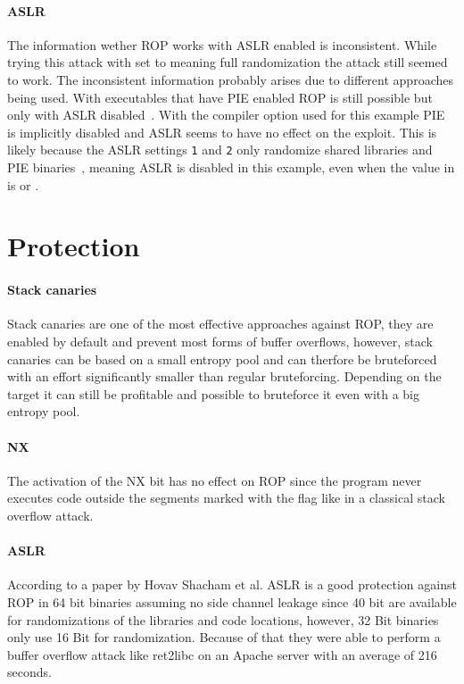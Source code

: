\documentclass[journal=tosc,submission, notanonymous]{iacrtrans}
\begin{document}
\paragraph{ASLR}
The information wether ROP works with ASLR enabled is inconsistent. While trying this attack with  set to  meaning full randomization the attack still seemed to work. The inconsistent information probably arises due to different approaches being used. With executables that have PIE enabled ROP is still possible but only with ASLR disabled~\cite{el-sherei}. With the compiler option  used for this example PIE is implicitly disabled and ASLR seems to have no effect on the exploit. This is likely because the ASLR settings \Verb+1+ and \Verb+2+ only randomize shared libraries and PIE binaries~\cite{rny}, meaning ASLR is disabled in this example, even when the value in  is  or .

\section{Protection}
\paragraph{Stack canaries}
Stack canaries are one of the most effective approaches against ROP, they are enabled by default and prevent most forms of buffer overflows, however, stack canaries can be based on a small entropy pool and can therfore be bruteforced with an effort significantly smaller than regular bruteforcing. Depending on the target it can still be profitable and possible to bruteforce it even with a big entropy pool.
\paragraph{NX}
The activation of the NX bit has no effect on ROP since the program never executes code outside the segments marked with the  flag like in a classical stack overflow attack.~\cite{ropsla}
\paragraph{ASLR}
According to a paper by Hovav Shacham et al. ASLR is a good protection against ROP in 64 bit binaries assuming no side channel leakage since 40 bit are available for randomizations of the libraries and code locations, however, 32 Bit binaries only use 16 Bit for randomization. Because of that they were able to perform a buffer overflow attack like ret2libc on an Apache server with an average of 216 seconds.~\cite{aslr}
\end{document}
